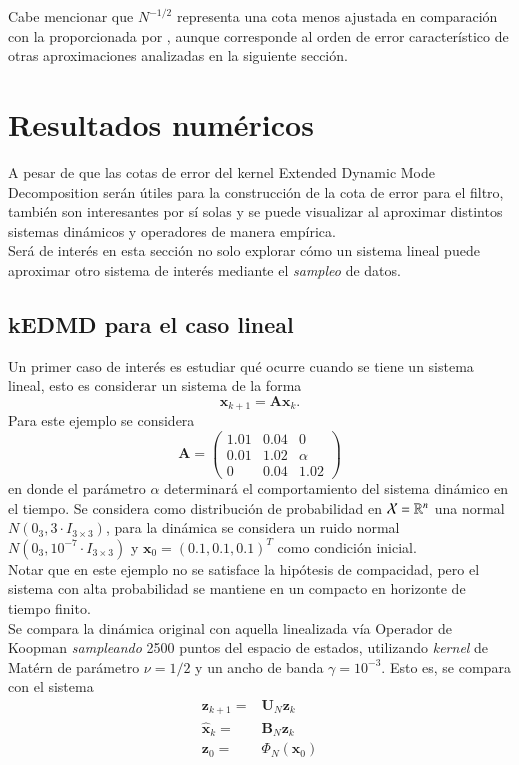 Cabe mencionar que \( N^{-1/2} \) representa una cota menos ajustada en comparación con la proporcionada por \cite{Philipp2024ErrorOperator}, aunque corresponde al orden de error característico de otras aproximaciones analizadas en la siguiente sección.

\section{Resultados numéricos}

A pesar de que las cotas de error del kernel Extended Dynamic Mode Decomposition serán útiles para la construcción de la cota de error para el filtro, también son interesantes por sí solas y se puede visualizar al aproximar distintos sistemas dinámicos y operadores de manera empírica.\\
Será de interés en esta sección no solo explorar cómo un sistema lineal puede aproximar otro sistema de interés mediante el \textit{sampleo} de datos.

\subsection{kEDMD para el caso lineal}

Un primer caso de interés es estudiar qué ocurre cuando se tiene un sistema lineal, esto es considerar un sistema de la forma
\begin{equation*}
    \mathbf{x}_{k+1} = \mathbf{A} \mathbf{x}_{k}.
\end{equation*}
Para este ejemplo se considera
\begin{equation*}
    \mathbf{A} = 
    \begin{pmatrix}
        1.01 & 0.04 & 0 \\
        0.01 & 1.02 & \alpha \\
        0 & 0.04 & 1.02
    \end{pmatrix}
\end{equation*}
en donde el parámetro $\alpha$ determinará el comportamiento del sistema dinámico en el tiempo. Se considera como distribución de probabilidad en $\mathcal{X} = \mathbb{R}^n$ una normal $N(0_{3}, 3 \cdot I_{3\times3})$, para la dinámica se considera un ruido normal $N(0_{3}, 10^{-7} \cdot I_{3\times3})$ y $\mathbf{x}_0 = (0.1, 0.1, 0.1)^T$ como condición inicial.\\
Notar que en este ejemplo no se satisface la hipótesis de compacidad, pero el sistema con alta probabilidad se mantiene en un compacto en horizonte de tiempo finito.\\
Se compara la dinámica original con aquella linealizada vía Operador de Koopman \textit{sampleando} 2500 puntos del espacio de estados, utilizando \textit{kernel} de Matérn de parámetro $\nu = 1/2$ y un ancho de banda $\gamma = 10^{-3}$. Esto es, se compara con el sistema
\begin{align*}
    \mathbf{z}_{k+1} = & \mathbf{U}_N \mathbf{z}_k \\
    \hat{\mathbf{x}}_k = & \mathbf{B}_N \mathbf{z}_k \\
    \mathbf{z}_0 = & \Phi_N(\mathbf{x}_0)
\end{align*}

